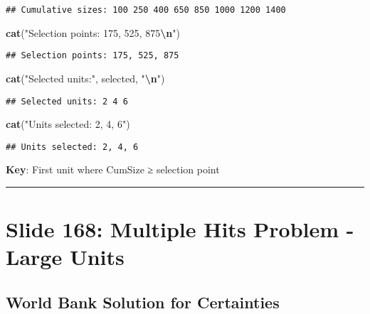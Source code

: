 \documentclass[
]{article}
\newenvironment{Shaded}{\begin{snugshade}}{\end{snugshade}}
\newcommand{\FunctionTok}[1]{\textcolor[rgb]{0.13,0.29,0.53}{\textbf{#1}}}
\newcommand{\NormalTok}[1]{#1}
\newcommand{\SpecialCharTok}[1]{\textcolor[rgb]{0.81,0.36,0.00}{\textbf{#1}}}
\newcommand{\StringTok}[1]{\textcolor[rgb]{0.31,0.60,0.02}{#1}}
\begin{document}
\begin{verbatim}
## Cumulative sizes: 100 250 400 650 850 1000 1200 1400
\end{verbatim}

\begin{Shaded}
\begin{Highlighting}[]
\FunctionTok{cat}\NormalTok{(}\StringTok{"Selection points: 175, 525, 875}\SpecialCharTok{\textbackslash{}n}\StringTok{"}\NormalTok{)}
\end{Highlighting}
\end{Shaded}

\begin{verbatim}
## Selection points: 175, 525, 875
\end{verbatim}

\begin{Shaded}
\begin{Highlighting}[]
\FunctionTok{cat}\NormalTok{(}\StringTok{"Selected units:"}\NormalTok{, selected, }\StringTok{"}\SpecialCharTok{\textbackslash{}n}\StringTok{"}\NormalTok{)}
\end{Highlighting}
\end{Shaded}

\begin{verbatim}
## Selected units: 2 4 6
\end{verbatim}

\begin{Shaded}
\begin{Highlighting}[]
\FunctionTok{cat}\NormalTok{(}\StringTok{"Units selected: 2, 4, 6"}\NormalTok{)}
\end{Highlighting}
\end{Shaded}

\begin{verbatim}
## Units selected: 2, 4, 6
\end{verbatim}

\textbf{Key}: First unit where CumSize ≥ selection point

\begin{center}\rule{0.5\linewidth}{0.5pt}\end{center}

\section{Slide 168: Multiple Hits Problem - Large
Units}\label{slide-168-multiple-hits-problem---large-units}

\subsection{World Bank Solution for
Certainties}\label{world-bank-solution-for-certainties}
\end{document}
